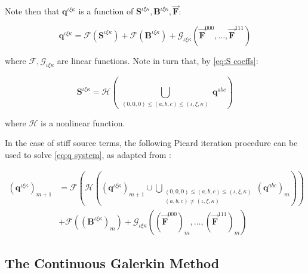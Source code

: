 \documentclass[twoside,english,final,5p,times,twocolumn]{elsarticle}
\begin{document}
Note then that $\boldsymbol{q}^{\iota\xi\kappa}$ is a function of
$\boldsymbol{S}^{\iota\xi\kappa},\boldsymbol{B}^{\iota\xi\kappa},\overrightarrow{\boldsymbol{F}}$:

\begin{equation}
\boldsymbol{q}^{\iota\xi\kappa}=\mathcal{F}\left(\boldsymbol{S}^{\iota\xi\kappa}\right)+\mathcal{F}\left(\boldsymbol{B}^{\iota\xi\kappa}\right)+\mathcal{G_{\iota\xi\kappa}}\left(\overrightarrow{\boldsymbol{F}}^{000},\ldots,\overrightarrow{\boldsymbol{F}}^{111}\right)
\end{equation}

where $\mathcal{F},\mathcal{G_{\iota\xi\kappa}}$ are linear functions.
Note in turn that, by \eqref{eq:S coeffs}:

\begin{equation}
\boldsymbol{S}^{\iota\xi\kappa}=\mathcal{H}\left(\bigcup_{\begin{array}{c}
\left(0,0,0\right)\leq\left(a,b,c\right)\leq\left(\iota,\xi,\kappa\right)\end{array}}\boldsymbol{q}^{abc}\right)
\end{equation}

where $\mathcal{H}$ is a nonlinear function.

In the case of stiff source terms, the following Picard iteration
procedure can be used to solve \eqref{eq:q system}, as adapted from
\citet{Montecinos2017}:

\begin{align}
\left(\boldsymbol{q}^{\iota\xi\kappa}\right)_{m+1} & =\mathcal{F}\left(\mathcal{H}\left(\left(\boldsymbol{q}^{\iota\xi\kappa}\right)_{m+1}\cup\bigcup_{\begin{array}{c}
\left(0,0,0\right)\leq\left(a,b,c\right)\leq\left(\iota,\xi,\kappa\right)\\
\left(a,b,c\right)\neq\left(\iota,\xi,\kappa\right)
\end{array}}\left(\boldsymbol{q}^{abc}\right)_{m}\right)\right)\\
 & +\mathcal{F}\left(\left(\boldsymbol{B}^{\iota\xi\kappa}\right)_{m}\right)+\mathcal{G_{\iota\xi\kappa}}\left(\left(\overrightarrow{\boldsymbol{F}}^{000}\right)_{m},\ldots,\left(\overrightarrow{\boldsymbol{F}}^{111}\right)_{m}\right)\nonumber 
\end{align}


\subsection{The Continuous Galerkin Method}
\end{document}
